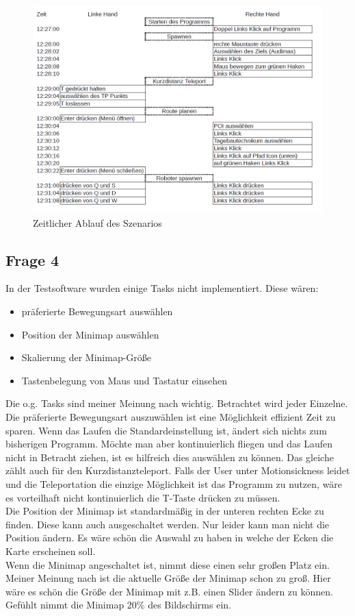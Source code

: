 \documentclass{TUBAFarbeiten}
\begin{document}
\begin{figure}
	\centering
	\includegraphics[width=\linewidth]{logic.png}
	\caption{Zeitlicher Ablauf des Szenarios}
	\label{fig:logic}
\end{figure}
\newpage

\subsection{Frage 4}
\label{sec:nichtunterstuetztetask}
In der Testsoftware wurden einige Tasks nicht implementiert. Diese wären:
\begin{itemize}
	\item präferierte Bewegungsart auswählen
	\item Position der Minimap auswählen
	\item Skalierung der Minimap-Größe
	\item Tastenbelegung von Maus und Tastatur einsehen
\end{itemize}
Die o.g. Tasks sind meiner Meinung nach wichtig. Betrachtet wird jeder Einzelne. \\
Die präferierte Bewegungsart auszuwählen ist eine Möglichkeit effizient Zeit zu sparen. Wenn das Laufen die Standardeinstellung ist, ändert sich nichts zum bisherigen Programm. Möchte man aber kontinuierlich fliegen und das Laufen nicht in Betracht ziehen, ist es hilfreich dies auswählen zu können. Das gleiche zählt auch für den Kurzdistanzteleport. Falls der User unter Motionsickness leidet und die Teleportation die einzige Möglichkeit ist das Programm zu nutzen, wäre es vorteilhaft nicht kontinuierlich die T-Taste drücken zu müssen.\\
Die Position der Minimap ist standardmäßig in der unteren rechten Ecke zu finden. Diese kann auch ausgeschaltet werden. Nur leider kann man nicht die Position ändern. Es wäre schön die Auswahl zu haben in welche der Ecken die Karte erscheinen soll.\\
Wenn die Minimap angeschaltet ist, nimmt diese einen sehr großen Platz ein. Meiner Meinung nach ist die aktuelle Größe der Minimap schon zu groß. Hier wäre es schön die Größe der Minimap mit z.B. einen Slider ändern zu können. Gefühlt nimmt die Minimap 20\% des Bildschirms ein. 
\end{document}
